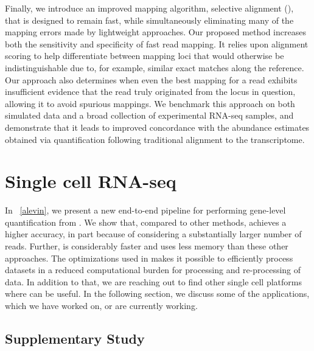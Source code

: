 Finally, we introduce an improved mapping algorithm, selective alignment (\hsa),
that is designed to remain fast, while simultaneously eliminating many of the
mapping errors made by lightweight approaches. Our proposed method increases
both the sensitivity and specificity of fast read mapping. It relies upon
alignment scoring to help differentiate between mapping loci that would
otherwise be indistinguishable due to, for example, similar exact matches along
the reference. Our approach also determines when even the best mapping for a
read exhibits insufficient evidence that the read truly originated from the
locus in question, allowing it to avoid spurious mappings. We benchmark this
approach on both simulated data and a broad collection of experimental
RNA-seq samples, and demonstrate that it leads to improved
concordance with the abundance estimates obtained via quantification following
traditional alignment to the transcriptome.

\section{Single cell RNA-seq}
In ~\cref{alevin}, we present a new end-to-end pipeline for performing gene-level 
quantification from \dscrnaseq. We show that, compared to other methods, \alevin achieves
a higher accuracy, in part because of considering a substantially larger number
of reads. Further, \alevin is considerably faster and uses less memory than
these other approaches. The optimizations used in \alevin makes it possible to 
efficiently process \dscrnaseq datasets in a reduced computational burden for 
processing and re-processing of \dscrnaseq data. In addition to that, we are reaching out to 
find other single cell platforms where \alevin can be useful. 
In the following section, we discuss some of the applications, which we have worked on, 
or are currently working.

\subsection{Supplementary Study}
